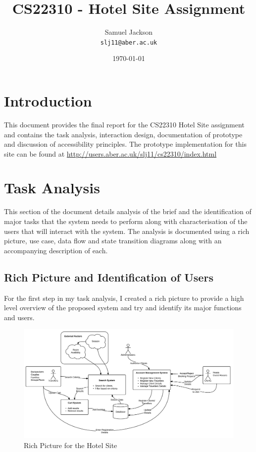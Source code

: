 \documentclass{article}
\begin{document}
\title{CS22310 - Hotel Site Assignment}
\author{Samuel Jackson \\ \texttt{slj11@aber.ac.uk}}
\date{\today}
\maketitle

\section{Introduction}
This document provides the final report for the CS22310 Hotel Site assignment and contains the task analysis, interaction design, documentation of prototype and discussion of accessibility principles. The prototype implementation for this site can be found at \url{http://users.aber.ac.uk/slj11/cs22310/index.html}

\section{Task Analysis}
This section of the document details analysis of the brief and the identification of major tasks that the system needs to perform along with characterisation of the users that will interact with the system. The analysis is documented using a rich picture, use case, data flow and state transition diagrams along with an accompanying description of each.

\subsection{Rich Picture and Identification of Users}
For the first step in my task analysis, I created a rich picture to provide a high level overview of the proposed system and try and identify its major functions and users.

\begin{figure}[H]
\centering
\includegraphics[width=1\textwidth]{img/richpic.png}
\caption{Rich Picture for the Hotel Site}
\label{fig:rich-pic}
\end{figure}
\end{document}
